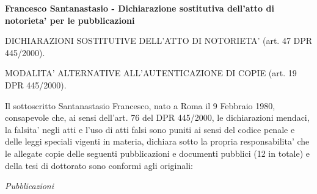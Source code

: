 \documentclass[10pt]{letter}
\begin{document}
{\large \sc \bf Francesco Santanastasio - Dichiarazione sostitutiva dell'atto di notorieta' per le pubblicazioni}

DICHIARAZIONI SOSTITUTIVE DELL'ATTO DI NOTORIETA' (art. 47 DPR 445/2000). 

MODALITA' ALTERNATIVE ALL'AUTENTICAZIONE DI COPIE (art. 19 DPR 445/2000). 

Il sottoscritto Santanastasio Francesco, 
nato a Roma il 9 Febbraio 1980, consapevole che, ai sensi dell'art. 76 del DPR 445/2000, le dichiarazioni mendaci, 
la falsita' negli atti e l'uso di atti falsi sono puniti ai sensi del codice penale e delle leggi speciali vigenti 
in materia, dichiara sotto la propria responsabilita' che le allegate copie delle seguenti pubblicazioni e documenti 
pubblici (12 in totale) e della tesi di dottorato sono conformi agli originali: 

\begin{center} \textit{Pubblicazioni} \end{center}
\end{document}
